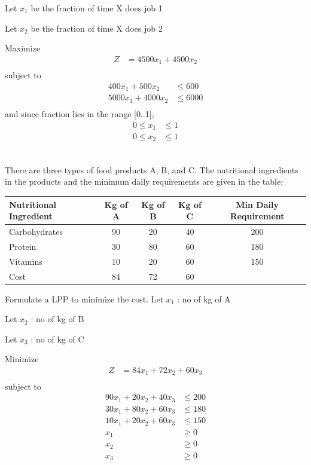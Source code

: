 \documentclass[12pt]{article}
\begin{document}
Let $x_1$ be the fraction of time X does job 1

Let $x_2$ be the fraction of time X does job 2

Maximize
\begin{align*}
Z&=4500x_1 + 4500 x_2  \\
\end{align*}
subject to
\begin{align*}
400x_1+500x_2&\le 600  \\
5000x_1+4000x_2&\le 6000  \\
\end{align*}
and since fraction lies in the range [0..1],
\begin{align*}
0\le x_1&\le 1  \\
0\le x_2&\le 1  \\
\end{align*}
\subsection{}

   There are three types of food products A, B, and C. The nutritional ingredients in the products and the minimum daily requirements are given in the table:

\begin{center}
\begin{tabular}{|l|ccc|c|}
\hline
 Nutritional Ingredient  &  Kg of A  &  Kg of B  &  Kg of C  &  Min Daily Requirement  \\
\hline
 Carbohydrates           &       90  &       20  &       40  &                    200  \\
 Protein                 &       30  &       80  &       60  &                    180  \\
 Vitamins                &       10  &       20  &       60  &                    150  \\
\hline
 Cost                    &       84  &       72  &       60  &                         \\
\hline
\end{tabular}
\end{center}



Formulate a LPP to minimize the cost.
Let $x_1$ : no of kg of A

Let $x_2$ : no of kg of B

Let $x_3$ : no of kg of C

Minimize
\begin{align*}
Z                 & =84x_1+72x_2+60x_3 \\
\end{align*}
subject to
\begin{align*}
90x_1+20x_2+40x_3 & \le 200            \\
30x_1+80x_2+60x_3 & \le 180            \\
10x_1+20x_2+60x_3 & \le 150            \\
x_1               & \ge 0              \\
x_2               & \ge 0              \\
x_3               & \ge 0 
\end{align*}
\end{document}
